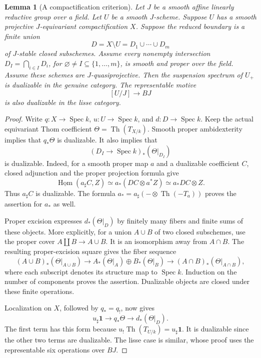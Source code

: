 \documentclass[11pt,reqno]{amsart}
\newtheorem{lemma}[theorem]{Lemma}
\theoremstyle{definition}
\theoremstyle{remark}
\theoremstyle{plain}
\numberwithin{equation}{section}
\newcommand{\one}{\mathbf 1}
\newcommand{\Hom}{\underline{\operatorname{Hom}}}
\DeclareMathOperator{\Spec}{Spec}
\DeclareMathOperator{\Th}{Th}
\begin{document}
\begin{lemma}[A compactification criterion]\label{lem:new-boundary-duality}
Let \(J\) be a smooth affine linearly reductive group over a field.
Let \(U\) be a smooth \(J\)-scheme.
Suppose \(U\) has a smooth projective \(J\)-equivariant compactification \(X\).
Suppose the reduced boundary is a finite union
\[
 D=X\setminus U=D_1\cup\cdots\cup D_m
\]
of \(J\)-stable closed subschemes.
Assume every nonempty intersection
\(D_I=\bigcap_{i\in I}D_i\), for \(\varnothing\ne I\subseteq\{1,\ldots,m\}\),
is smooth and proper over the field.
Assume these schemes are \(J\)-quasiprojective.
Then the suspension spectrum of \(U_+\) is dualizable in the genuine category.
The representable motive
\[
 [U/J]\longrightarrow BJ
\]
is also dualizable in the lisse category.
\end{lemma}
\begin{proof}
Write \(q:X\to\Spec k\), \(u:U\to\Spec k\), and \(d:D\to\Spec k\).
Keep the actual equivariant Thom coefficient
\(\Theta=\Th(T_{X/k})\).
Smooth proper ambidexterity implies that \(q_*\Theta\) is dualizable.
It also implies that
\[
 (D_I\to\Spec k)_*(\Theta|_{D_I})
\]
is dualizable.
Indeed, for a smooth proper map \(a\) and a dualizable coefficient \(C\),
closed adjunction and the proper projection formula give
\[
 \Hom(a_\sharp C,Z)
 \simeq a_*(DC\otimes a^*Z)
 \simeq a_*DC\otimes Z.
\]
Thus \(a_\sharp C\) is dualizable.
The formula \(a_*=a_\sharp(-\otimes\Th(-T_a))\) proves the assertion for
\(a_*\) as well.

Proper excision expresses \(d_*(\Theta|_D)\) by finitely many fibers and
finite sums of these objects.
More explicitly, for a union \(A\cup B\) of two closed subschemes, use the
proper cover \(A\amalg B\to A\cup B\).
It is an isomorphism away from \(A\cap B\).
The resulting proper-excision square gives the fiber sequence
\[
 (A\cup B)_*(\Theta|_{A\cup B})
 \longrightarrow
 A_*(\Theta|_A)\oplus B_*(\Theta|_B)
 \longrightarrow
 (A\cap B)_*(\Theta|_{A\cap B}),
\]
where each subscript denotes its structure map to \(\Spec k\).
Induction on the number of components proves the assertion.
Dualizable objects are closed under these finite operations.

Localization on \(X\), followed by \(q_*=q_!\), now gives
\[
 u_\sharp\one
 \longrightarrow q_*\Theta
 \longrightarrow d_*(\Theta|_D).
\]
The first term has this form because
\(u_!\Th(T_{U/k})=u_\sharp\one\).
It is dualizable since the other two terms are dualizable.
The lisse case is similar, 
whose proof uses the representable six operations over \(BJ\).
\end{proof}
\end{document}
